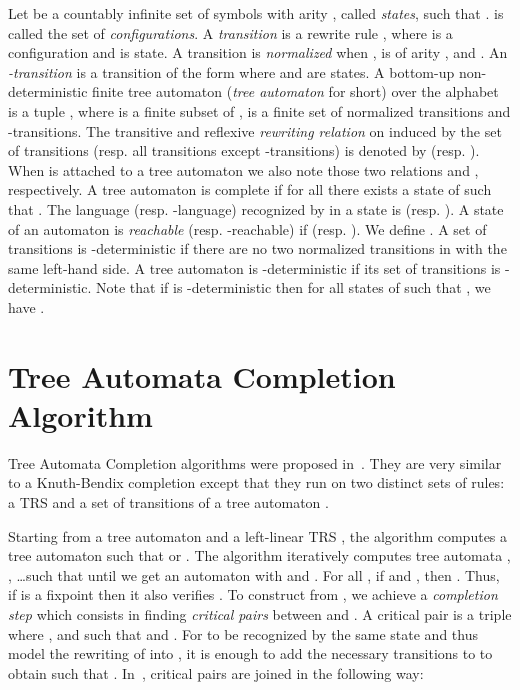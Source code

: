 \documentclass[a4paper,11pt]{llncs}
\def \R {\mathcal{R}}
\newcommand{\desc}{\R^*}
\newcommand{\nr}{E}
\newcommand{\comp}{{\cal C}}
\theoremstyle{plain}
\begin{document}
Let  be a countably infinite set of symbols with arity , called {\em states}, such
that .   is called the set of {\em
  configurations}. A {\em transition} is a rewrite rule , where  is
a configuration and  is state.  A transition is {\em normalized} when ,  is of arity , and . An {\em -transition} is a transition of the form 
where  and  are states. 
A bottom-up non-deterministic finite tree automaton ({\em tree automaton} for short)
over the alphabet  is a tuple ,
where  is a finite subset of ,  is a finite set of normalized transitions and
-transitions. The transitive and reflexive {\em rewriting relation}
on  induced by the set of transitions  (resp. all transitions
except -transitions) is denoted by 
(resp. ). When  is attached to a tree automaton  we also
note those two relations  and , respectively. A tree
automaton  is complete if for all  there exists a state  of 
such that . The language (resp. -language) recognized by
 in a state  is 
(resp. ). A state
 of an automaton  is {\em reachable} (resp. -reachable) if
 (resp. ). 
We define .  
A set of transitions  is
-deterministic if there are no two normalized transitions in 
with the same left-hand side.  A tree automaton  is
-deterministic if its set of transitions is -deterministic.
Note that if  is -deterministic then for all states  of
 such that , we have .


  
\section{Tree Automata Completion Algorithm}
\label{chap:theo}

Tree Automata Completion algorithms were proposed
in~\cite{Jacquemard-RTA96,Genet-RTA98,Takai-RTA04,GenetR-JSC10}. They
are very similar to a Knuth-Bendix completion except that they run on two distinct
sets of rules: a TRS  and a set of transitions  of a tree automaton
. 




\newcommand{\oldcomp}{{\cal C}_{\R,\alpha}}
\renewcommand{\nr}{\alpha}
\renewcommand{\comp}{{\cal C}_{\R,\alpha}}
\renewcommand{\desc}[1]{#1^{*}}


Starting from a tree automaton  and a left-linear
TRS , the algorithm computes a tree automaton 
such that  or . 
The algorithm iteratively computes tree automata ,
, \ldots such that  until we get an automaton  with 
and . For all , if  and , then . Thus, if
 is a fixpoint then it also verifies .
To construct  from , we achieve a {\em completion step}
which consists in finding {\em critical pairs} between  and
. A critical pair is a triple  where ,  and  such that  and .  For  to be recognized by the same state and
thus model the rewriting of  into , it is enough to add the
necessary transitions to  to obtain  such that . In~\cite{Takai-RTA04,GenetR-JSC10}, critical pairs are
joined in the following way: 
\end{document}
